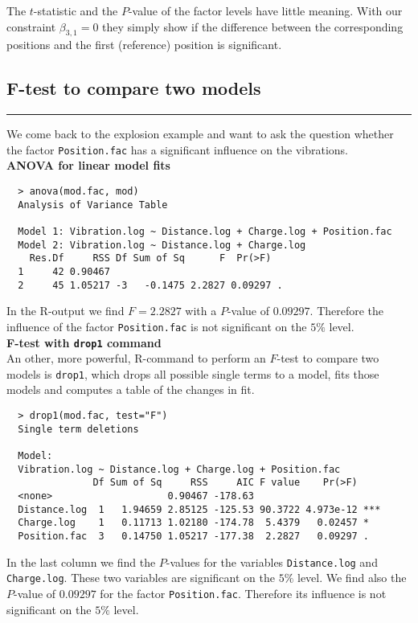 The $t$-statistic and the $P$-value of the factor levels have little meaning. With our constraint $\beta_{3,1} = 0$ they simply show if the difference between the corresponding positions and the first (reference) position is significant.


\subsection{F-test to compare two models}
\noindent\rule[\linienAbstand]{\linewidth}{\linienDicke}
We come back to the explosion example and want to ask the question whether the factor \texttt{Position.fac} has a significant influence on the vibrations.\\

\textbf{ANOVA for linear model fits}\\
\begingroup
\scriptsize
\begin{verbatim}
  > anova(mod.fac, mod)
  Analysis of Variance Table

  Model 1: Vibration.log ~ Distance.log + Charge.log + Position.fac
  Model 2: Vibration.log ~ Distance.log + Charge.log
    Res.Df     RSS Df Sum of Sq      F  Pr(>F)
  1     42 0.90467
  2     45 1.05217 -3   -0.1475 2.2827 0.09297 .

\end{verbatim}
\endgroup
In the R-output we find $F = 2.2827$ with a $P$-value of $0.09297$. Therefore the influence of the factor \texttt{Position.fac} is not significant on the $5\%$ level.\\

\textbf{F-test with \texttt{drop1} command}\\
An other, more powerful, R-command to perform an $F$-test to compare two models is \texttt{drop1}, which drops all possible single terms to a model, fits those models and computes a table of the changes in fit.\\

\begingroup
\scriptsize
\begin{verbatim}
  > drop1(mod.fac, test="F")
  Single term deletions

  Model:
  Vibration.log ~ Distance.log + Charge.log + Position.fac
               Df Sum of Sq     RSS     AIC F value    Pr(>F)
  <none>                    0.90467 -178.63
  Distance.log  1   1.94659 2.85125 -125.53 90.3722 4.973e-12 ***
  Charge.log    1   0.11713 1.02180 -174.78  5.4379   0.02457 *
  Position.fac  3   0.14750 1.05217 -177.38  2.2827   0.09297 .

\end{verbatim}
\endgroup
In the last column we find the $P$-values for the variables \texttt{Distance.log} and \texttt{Charge.log}. These two variables are significant on the $5\%$ level. We find also the $P$-value of $0.09297$ for the factor \texttt{Position.fac}. Therefore its influence is not significant on the $5\%$ level.\\



